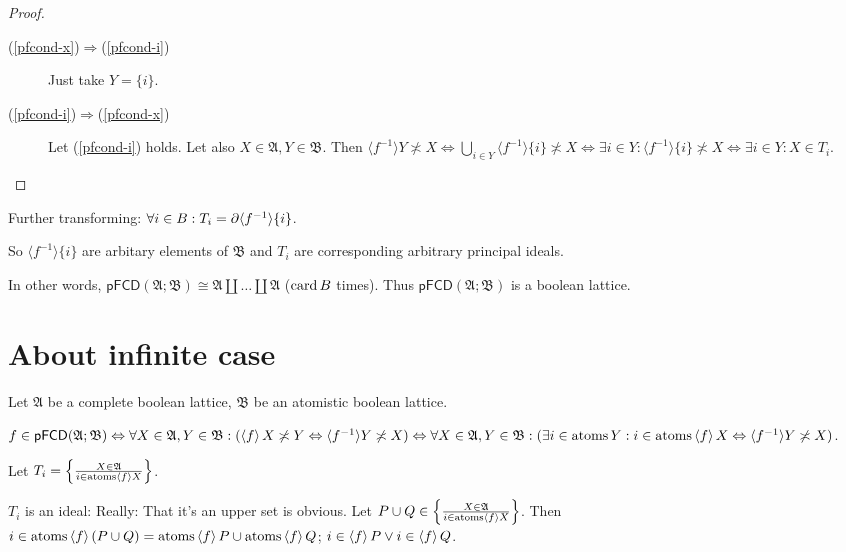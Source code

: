 \begin{proof}
  
  \begin{description}
    \item[(\ref{pfcond-x})$\Rightarrow$(\ref{pfcond-i})] Just take $Y = \{ i
    \}$.
    
    \item[(\ref{pfcond-i})$\Rightarrow$(\ref{pfcond-x})] Let (\ref{pfcond-i})
    holds. Let also $X \in \mathfrak{A}, Y \in \mathfrak{B}$. Then $\langle
    f^{- 1} \rangle Y \nasymp X \Leftrightarrow \bigcup_{i \in Y} \langle f^{-
    1} \rangle \{ i \} \nasymp X \Leftrightarrow \exists i \in Y : \langle
    f^{- 1} \rangle \{ i \} \nasymp X \Leftrightarrow \exists i \in Y : X \in
    T_i$.
  \end{description}
\end{proof}

Further transforming: $\forall i \in B : T_i = \partial \langle f^{- 1}
\rangle \{ i \}$.

So $\langle f^{- 1} \rangle \{ i \}$ are arbitary elements of $\mathfrak{B}$
and $T_i$ are corresponding arbitrary principal ideals.

In other words, $\mathsf{pFCD} (\mathfrak{A}; \mathfrak{B}) \cong \mathfrak{A}
\amalg \ldots \amalg \mathfrak{A}$ ($\operatorname{card} B$ times). Thus $\mathsf{pFCD}
(\mathfrak{A}; \mathfrak{B})$ is a boolean lattice.

\section{About infinite case}

Let $\mathfrak{A}$ be a complete boolean lattice, $\mathfrak{B}$ be an
atomistic boolean lattice.

$f \in \mathsf{pFCD} (\mathfrak{A}; \mathfrak{B}) \Leftrightarrow \forall X \in
\mathfrak{A}, Y \in \mathfrak{B}: (\left\langle f\right\rangle X \not\asymp Y
\Leftrightarrow \langle f^{- 1} \rangle Y \not\asymp X) \Leftrightarrow \forall X
\in \mathfrak{A}, Y \in \mathfrak{B}: (\exists i \in \operatorname{atoms} Y : i \in
\operatorname{atoms} \left\langle f\right\rangle X \Leftrightarrow \langle f^{- 1} \rangle Y
\not\asymp X)$.

Let $T_i = \left\{ \frac{ X \in \mathfrak{A} }{ i \in
\operatorname{atoms} \left\langle f\right\rangle X }\right\}$.

$T_i$ is an ideal: Really: That it's an upper set is obvious. Let $P \cup Q
\in \left\{ \frac{ X \in \mathfrak{A} }{ i \in \operatorname{atoms}
\left\langle f\right\rangle X }\right\}$. Then $i \in \operatorname{atoms} \left\langle f\right\rangle (P
\cup Q) = \operatorname{atoms} \left\langle f\right\rangle P \cup \operatorname{atoms} \left\langle f\right\rangle
Q$; $i \in \left\langle f\right\rangle P \vee i \in \left\langle f\right\rangle Q$.


